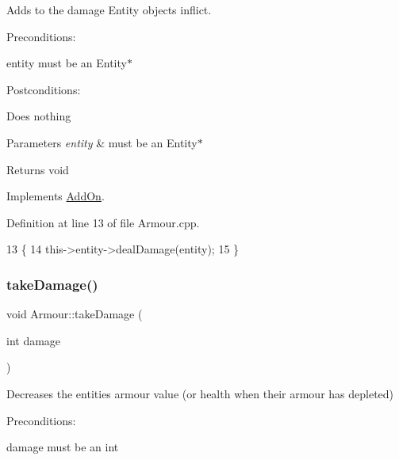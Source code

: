 Adds to the damage Entity objects inflict. 

Preconditions\+:
\begin{DoxyItemize}
\item entity must be an Entity$\ast$
\end{DoxyItemize}

Postconditions\+:
\begin{DoxyItemize}
\item Does nothing
\end{DoxyItemize}


\begin{DoxyParams}{Parameters}
{\em entity} & must be an Entity$\ast$ \\
\hline
\end{DoxyParams}
\begin{DoxyReturn}{Returns}
void 
\end{DoxyReturn}


Implements \hyperlink{classAddOn_aff1f4fa0fb368bbc49838df9c9ddba9c}{Add\+On}.



Definition at line 13 of file Armour.\+cpp.


\begin{DoxyCode}
13                                       \{
14     this->entity->dealDamage(entity);
15 \}
\end{DoxyCode}
\mbox{\label{classArmour_a7a52bd8473173c81a4ba8a6373513581}} 
\subsubsection{\texorpdfstring{take\+Damage()}{takeDamage()}}
{\footnotesize\ttfamily void Armour\+::take\+Damage (\begin{DoxyParamCaption}\item[{int}]{damage }\end{DoxyParamCaption})\hspace{0.3cm}{\ttfamily [virtual]}}



Decreases the entities\textquotesingle{} armour value (or health when their armour has depleted) 

Preconditions\+:
\begin{DoxyItemize}
\item damage must be an int
\end{DoxyItemize}

